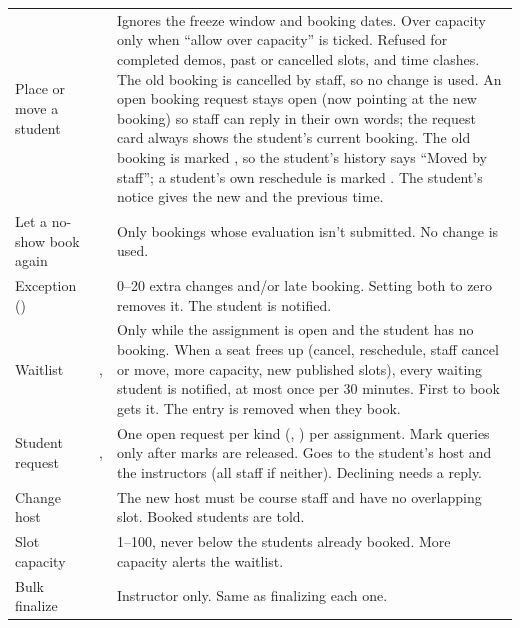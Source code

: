 {\tablefont
\begin{xltabular}{\linewidth}{@{}P{30mm} P{30mm} L@{}}
  \toprule
   &  & \\
  \midrule
  \endhead
  Place or move a student &  & Ignores the freeze window and booking dates. Over capacity only when ``allow over capacity'' is ticked. Refused for completed demos, past or cancelled slots, and time clashes. The old booking is cancelled by staff, so no change is used. An open booking request stays open (now pointing at the new booking) so staff can reply in their own words; the request card always shows the student's current booking. The old booking is marked , so the student's history says ``Moved by staff''; a student's own reschedule is marked . The student's notice gives the new and the previous time.\\
  Let a no-show book again &  & Only  bookings whose evaluation isn't submitted. No change is used.\\
  Exception () &  & 0--20 extra changes and/or late booking. Setting both to zero removes it. The student is notified.\\
  Waitlist & ,  & Only while the assignment is open and the student has no booking. When a seat frees up (cancel, reschedule, staff cancel or move, more capacity, new published slots), every waiting student is notified, at most once per 30 minutes. First to book gets it. The entry is removed when they book.\\
  Student request & ,  & One open request per kind (, ) per assignment. Mark queries only after marks are released. Goes to the student's host and the instructors (all staff if neither). Declining needs a reply.\\
  Change host &  & The new host must be course staff and have no overlapping slot. Booked students are told.\\
  Slot capacity &  & 1--100, never below the students already booked. More capacity alerts the waitlist.\\
  Bulk finalize &  & Instructor only. Same as finalizing each one.\\
  \bottomrule
\end{xltabular}}

